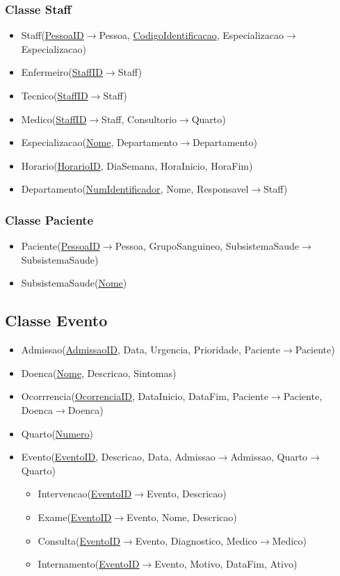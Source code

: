 \documentclass[article, a4paper, 12pt, oneside]{memoir}
\begin{document}
\subsubsection{Classe Staff}
\begin{itemize}
	\item Staff(\underline{PessoaID}$\rightarrow$Pessoa, \underline{CodigoIdentificacao}, Especializacao$\rightarrow$Especializacao)
	\item Enfermeiro(\underline{StaffID}$\rightarrow$Staff)
	\item Tecnico(\underline{StaffID}$\rightarrow$Staff)
	\item Medico(\underline{StaffID}$\rightarrow$Staff, Consultorio$\rightarrow$Quarto)
	\item Especializacao(\underline{Nome}, Departamento$\rightarrow$Departamento)
	\item Horario(\underline{HorarioID}, DiaSemana, HoraInicio, HoraFim)
	\item Departamento(\underline{NumIdentificador}, Nome, Responsavel$\rightarrow$Staff)
\end{itemize}
\subsubsection{Classe Paciente}
\begin{itemize}
	\item Paciente(\underline{PessoaID}$\rightarrow$Pessoa, GrupoSanguineo, SubsistemaSaude$\rightarrow$SubsistemaSaude)
	\item SubsistemaSaude(\underline{Nome})
\end{itemize}
\subsection{Classe Evento}
\begin{itemize}
	\item Admissao(\underline{AdmissaoID}, Data, Urgencia, Prioridade, Paciente$\rightarrow$Paciente)
	\item Doenca(\underline{Nome}, Descricao, Sintomas)
	\item Ocorrrencia(\underline{OcorrenciaID}, DataInicio, DataFim, Paciente$\rightarrow$Paciente, Doenca$\rightarrow$Doenca)
	\item Quarto(\underline{Numero})
	\item Evento(\underline{EventoID}, Descricao, Data, Admissao$\rightarrow$Admissao, Quarto$\rightarrow$Quarto)
	\begin{itemize}
		\item Intervencao(\underline{EventoID}$\rightarrow$Evento, Descricao)
		\item Exame(\underline{EventoID}$\rightarrow$Evento, Nome, Descricao)
		\item Consulta(\underline{EventoID}$\rightarrow$Evento, Diagnostico, Medico$\rightarrow$Medico)
		\item Internamento(\underline{EventoID}$\rightarrow$Evento, Motivo, DataFim, Ativo)
	\end{itemize}
\end{itemize}
\end{document}
